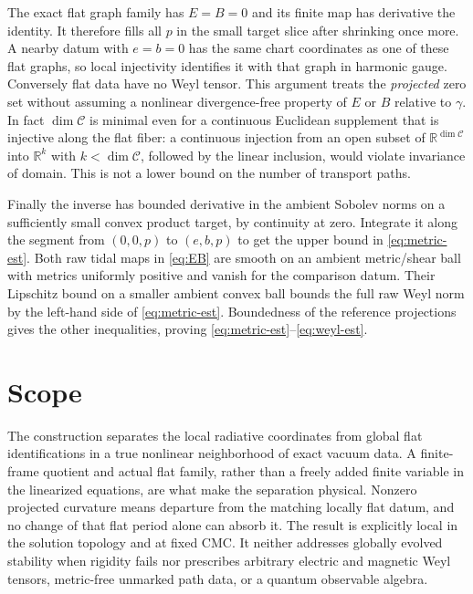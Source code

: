 \documentclass[11pt]{article}
\theoremstyle{remark}
\newcommand{\C}{\mathcal C}
\begin{document}
The exact flat graph family has \(E=B=0\) and its finite map has derivative the identity. It therefore fills all \(p\) in the small target slice after shrinking once more. A nearby datum with \(e=b=0\) has the same chart coordinates as one of these flat graphs, so local injectivity identifies it with that graph in harmonic gauge. Conversely flat data have no Weyl tensor. This argument treats the \emph{projected} zero set without assuming a nonlinear divergence-free property of \(E\) or \(B\) relative to \(\gamma\). In fact \(\dim\C\) is minimal even for a continuous Euclidean supplement that is injective along the flat fiber: a continuous injection from an open subset of \(\mathbb R^{\dim\C}\) into \(\mathbb R^k\) with \(k<\dim\C\), followed by the linear inclusion, would violate invariance of domain. This is not a lower bound on the number of transport paths.

Finally the inverse has bounded derivative in the ambient Sobolev norms on a sufficiently small convex product target, by continuity at zero. Integrate it along the segment from \((0,0,p)\) to \((e,b,p)\) to get the upper bound in \eqref{eq:metric-est}. Both raw tidal maps in \eqref{eq:EB} are smooth on an ambient metric/shear ball with metrics uniformly positive and vanish for the comparison datum. Their Lipschitz bound on a smaller ambient convex ball bounds the full raw Weyl norm by the left-hand side of \eqref{eq:metric-est}. Boundedness of the reference projections gives the other inequalities, proving \eqref{eq:metric-est}--\eqref{eq:weyl-est}.

\section{Scope}

The construction separates the local radiative coordinates from global flat identifications in a true nonlinear neighborhood of exact vacuum data. A finite-frame quotient and actual flat family, rather than a freely added finite variable in the linearized equations, are what make the separation physical. Nonzero projected curvature means departure from the matching locally flat datum, and no change of that flat period alone can absorb it. The result is explicitly local in the solution topology and at fixed CMC. It neither addresses globally evolved stability when rigidity fails nor prescribes arbitrary electric and magnetic Weyl tensors, metric-free unmarked path data, or a quantum observable algebra.
\end{document}
